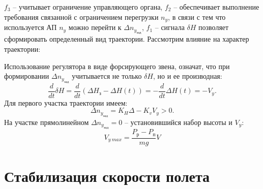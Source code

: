 \documentclass{article}
\begin{document}
\begin{figure}[ht]
	\centering
	\label{fig:fig_55}
\end{figure}

$f_3$ -- учитывает ограничение управляющего органа, $f_2$ -- обеспечивает
выполнение требования связанной с ограничением перегрузки $n_y$, в связи с тем
что используется АП $n_y$ можно перейти к $ \Delta n_{y_\text{зад}}$, $f_1$ --
сигнала $\delta H$ позволяет сформировать определенный вид траектории.
Рассмотрим влияние на характер траектории:

\begin{figure}[ht]
	\centering
	\label{fig:fig_46}
\end{figure}

Использование регулятора в виде форсирующего звена, означат, что при
формировании $ \Delta n_{y_\text{зад}}$ учитывается не только $\delta H$, но и
ее производная:
\[
	\frac{d}{dt} \delta H = \frac{d}{dt} (\Delta H_\text{з} - \Delta H (t)) = -
	\frac{d}{dt} \Delta H(t) = -V_y
	.\]
Для первого участка траектории имеем:
\[
	\Delta n_{y_\text{зад}} = K_H \Delta - K_v V_y > 0
	.\]
На участке прямолинейном $ \Delta n_{y_\text{зад}} = 0$ -- установившийся набор
высоты и $V_y$:
\[
	V_{y \ max} = \frac{P_\text{р} - P_\text{п}}{mg}V
\]

\section{Стабилизация скорости полета}
\end{document}
